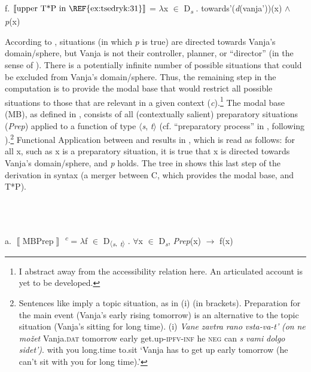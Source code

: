 \documentclass[output=paper,colorlinks,citecolor=brown]{./langscibook}
\begin{document}
  f.   $\left\llbracket \text{upper T*P in \REF{ex:tsedryk:31}}\right\rrbracket $ = ${\lambda}$x ${\in}$ D\textit{\textsubscript{s}} . towards'(\textit{d}(vanja'))(x) ${\wedge}$ \textit{p}(x)  

According to , situations (in which \textit{p} is true) are directed towards Vanja’s domain/sphere, but Vanja is not their controller, planner, or “director” (in the sense of \citealt[272]{Copley2008}). There is a potentially infinite number of possible situations that could be excluded from Vanja’s domain/sphere. Thus, the remaining step in the computation is to provide the modal base that would restrict all possible situations to those that are relevant in a given context (\textit{c}).\footnote{I abstract away from the accessibility relation here. An articulated account is yet to be developed.}  The modal base (MB), as defined in , consists of all (contextually salient) preparatory situations (\textit{Prep}) applied to a function of type ${\langle}$\textit{s}, \textit{t}${\rangle}$ (cf. “preparatory process” in \citealt[328-331]{CipriaRoberts2000}, following \citealt{MoensSteedman1988}).\footnote{Sentences like  imply a topic situation, as in (i) (in brackets). Preparation for the main event (Vanja’s early rising tomorrow) is an alternative to the topic situation (Vanja’s sitting for long time).    (i)  \textit{Vane}\textbf{ }        \textit{zavtra}       \textit{rano}   \textit{vsta-va-t’}         \textit{(on}   \textit{ne}       \textit{možet}         Vanja.\textsc{dat}  tomorrow  early    get.up-\textsc{ipfv-inf} he     \textsc{neg}    can               \textit{s}       \textit{vami}  \textit{dolgo}       \textit{sidet’)}.    with you   long.time  to.sit    ‘Vanja has to get up early tomorrow (he can’t sit with you for long time).’} Functional Application between  and  results in , which is read as follows: for all x, such as x is a preparatory situation, it is true that x is directed towards Vanja’s domain/sphere, and \textit{p} holds. The tree in  shows this last step of the derivation in syntax (a merger between C, which provides the modal base, and T*P).  

\ea%
    \label{ex:tsedryk:35}
    \gll\\
        \\
    \glt
    \z

          a.   $\left\llbracket \text{MB}\text{Prep}\right\rrbracket $ \textit{\textsuperscript{c}} = ${\lambda}$f ${\in}$ D\textsubscript{${\langle}$}\textit{\textsubscript{s}}\textsubscript{,} \textit{\textsubscript{t}}\textsubscript{${\rangle}$} . ${\forall}$x ${\in}$ D\textit{\textsubscript{s}}, \textit{Prep}(x) ${\rightarrow}$ f(x) 
\end{document}
